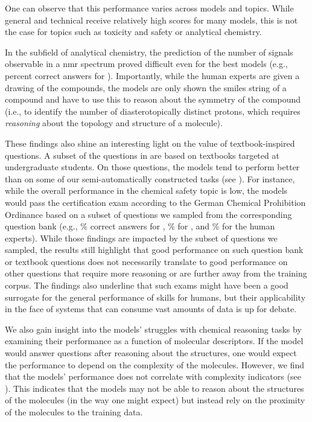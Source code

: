 \documentclass[11pt, oneside]{article}
\begin{document}
\begin{refsegment}
One can observe that this performance varies across models and topics.
While general and technical receive relatively high scores for many models, this is not the case for topics such as toxicity and safety or analytical chemistry.

In the subfield of analytical chemistry, the prediction of the number of signals observable in a \gls{nmr} spectrum proved difficult even for the best models (e.g.,  percent correct answers for \oone).
Importantly, while the human experts are given a drawing of the compounds, the models are only shown the \gls{smiles} string of a compound and have to use this to reason about the symmetry of the compound (i.e., to identify the number of diasterotopically distinct protons, which requires \emph{reasoning} about the topology and structure of a molecule).

 These findings also shine an interesting light on the value of textbook-inspired questions.
 A subset of the questions in \chembench are based on textbooks targeted at undergraduate students.
 On those questions, the models tend to perform better than on some of our semi-automatically constructed tasks (see ).
 For instance, while the overall performance in the chemical safety topic is low, the models would pass the certification exam according to the German Chemical Prohibition Ordinance based on a subset of questions we sampled from the corresponding question bank (e.g., \% correct answers for \GPTFour, \% for \ClaudeThreeFiveSonnet, and \% for the human experts).
 While those findings are impacted by the subset of questions we sampled, the results still highlight that good performance on such question bank or textbook questions does not necessarily translate to good performance on other questions that require more reasoning or are further away from the training corpus.\autocite{mccoy2023embersautoregressionunderstandinglarge} The findings also underline that such exams might have been a good surrogate for the general performance of skills for humans, but their applicability in the face of systems that can consume vast amounts of data is up for debate.

 We also gain insight into the models' struggles with chemical reasoning tasks by examining their performance as a function of molecular descriptors.
 If the model would answer questions after reasoning about the structures, one would expect the performance to depend on the complexity of the molecules.
 However, we find that the models' performance does not correlate with complexity indicators (see ).
 This indicates that the models may not be able to reason about the structures of the molecules (in the way one might expect) but instead rely on the proximity of the molecules to the training data.\autocite{mccoy2023embersautoregressionunderstandinglarge}


\end{refsegment}
\end{document}

